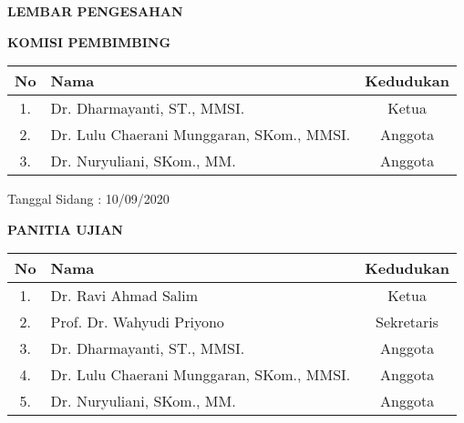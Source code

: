 \newpage
{}
\begin{center}
    {\large \bf \centering LEMBAR PENGESAHAN}

    \vspace{0.75cm}

    {\bf KOMISI PEMBIMBING}

    \vspace{0.5cm}

    \begin{tabular}{|c|l|c|}
        \hline
        \textbf{No} & \textbf{\hspace{4.3cm}Nama}                            & \textbf{Kedudukan} \\
        \hline

        1.          & Dr. Dharmayanti, ST., MMSI.                            & Ketua              \\
        \hline

        2.          & Dr. Lulu Chaerani Munggaran, SKom., MMSI. \hspace{2cm} & Anggota            \\
        \hline
        3.          & Dr. Nuryuliani, SKom., MM.                             & Anggota            \\
        \hline
    \end{tabular}

    \vspace{0.1cm}
    \begin{flushright}
        {Tanggal Sidang : 10/09/2020}
    \end{flushright}

    \vspace{0.5cm}

    {\bf PANITIA UJIAN}

    \vspace{0.5cm}

    \begin{tabular}{|c|l|c|}
        \hline
        \textbf{No} & \textbf{\hspace{4.3cm}Nama}                            & \textbf{Kedudukan} \\
        \hline

        1.          & Dr. Ravi Ahmad Salim                                   & Ketua              \\
        \hline

        2.          & Prof. Dr. Wahyudi Priyono                              & Sekretaris         \\
        \hline
        3.          & Dr. Dharmayanti, ST., MMSI.                            & Anggota            \\
        \hline
        4.          & Dr. Lulu Chaerani Munggaran, SKom., MMSI. \hspace{2cm} & Anggota            \\
        \hline
        5.          & Dr. Nuryuliani, SKom., MM.                             & Anggota            \\
        \hline
    \end{tabular}


\end{center}
